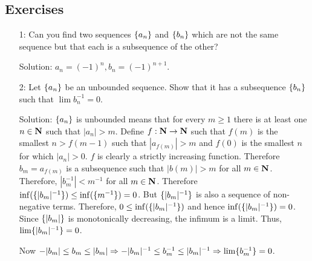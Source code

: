 \subsection{Exercises}
\begin{enumerate}
\item[1:] Can you find two sequences $\{a_n\}$ and $\{b_n\}$ which are
not the same sequence but that each is a subsequence of the other?
\item[Solution:] $a_n = (-1)^n, b_n = (-1)^{n+1}$.

\item[2:] Let $\{a_n\}$ be an unbounded sequence. Show that it has a 
subsequence $\{b_n\}$ such that $\lim b_n^{-1} = 0$.
\item[Solution:] $\{a_n\}$ is unbounded means that for every $m \ge 1$
there is at least one $n \in \mathbf{N}$ such that $|a_n| > m$. Define $f: \mathbf{N}
\rightarrow \mathbf{N}$ such that $f(m)$ is the smallest $n > f(m-1)$ such that
$|a_{f(m)}| > m$ and $f(0)$ is the smallest $n$ for which $|a_n| > 0$.
$f$ is clearly a strictly increasing function. Therefore $b_m = a_{f(m)}$ 
is a subsequence such that $|b(m)| > m$ for all $m \in \mathbf{N}$. Therefore,
$|b_m^{-1}| < m^{-1}$ for all $m \in \mathbf{N}$. Therefore 
$\inf(\{|b_m|^{-1}\}) \le \inf(\{m^{-1}\}) = 0$. But $\{|b_m|^{-1}\}$
is also a sequence of non-negative terms. Therefore, $0 \le \inf(\{|b_m|
^{-1}\})$ and hence $\inf(\{|b_m|^{-1}\}) = 0$. Since $\{|b_m|\}$ is
monotonically decreasing, the infimum is a limit. Thus, $\lim\{|b_m|^{
-1}\} = 0$.

Now $-|b_m| \le b_m \le |b_m| \Rightarrow -|b_m|^{-1} \le b_m^{-1} \le
|b_m|^{-1} \Rightarrow \lim\{b_m^{-1}\} = 0$.
\end{enumerate}

